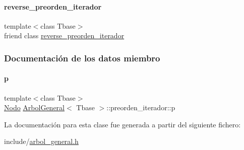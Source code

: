 \paragraph{\texorpdfstring{reverse\+\_\+preorden\+\_\+iterador}{reverse\_preorden\_iterador}}
{\footnotesize\ttfamily template$<$class Tbase$>$ \\
friend class \hyperlink{classArbolGeneral_1_1reverse__preorden__iterador}{reverse\+\_\+preorden\+\_\+iterador}\hspace{0.3cm}{\ttfamily [friend]}}



\subsubsection{Documentación de los datos miembro}
\hypertarget{classArbolGeneral_1_1preorden__iterador_afac01ba5fdc1e10c2a808d92f1dbddaf}{}\label{classArbolGeneral_1_1preorden__iterador_afac01ba5fdc1e10c2a808d92f1dbddaf} 
\paragraph{\texorpdfstring{p}{p}}
{\footnotesize\ttfamily template$<$class Tbase$>$ \\
\hyperlink{classArbolGeneral_a12cc1b74a9095d89bc7334290d332f7a}{Nodo} \hyperlink{classArbolGeneral}{Arbol\+General}$<$ Tbase $>$\+::preorden\+\_\+iterador\+::p\hspace{0.3cm}{\ttfamily [private]}}



La documentación para esta clase fue generada a partir del siguiente fichero\+:\begin{DoxyCompactItemize}
\item 
include/\hyperlink{arbol__general_8h}{arbol\+\_\+general.\+h}\end{DoxyCompactItemize}

